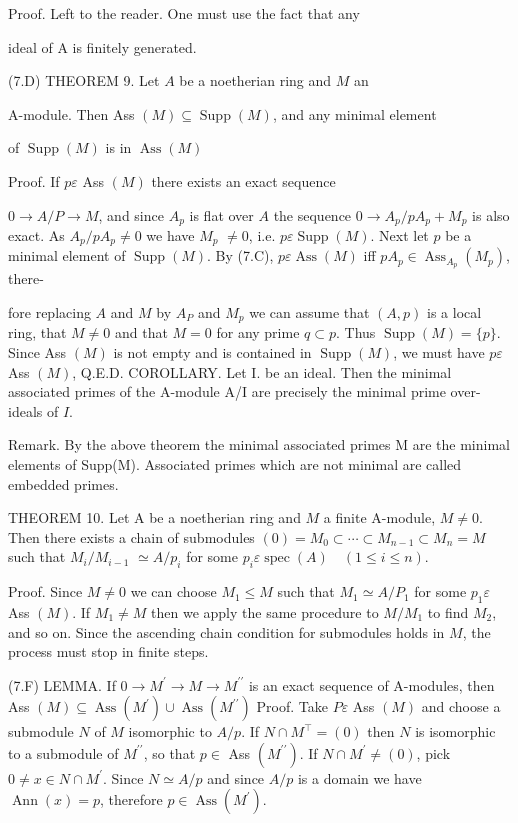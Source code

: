 Proof. Left to the reader. One must use the fact that any

ideal of A is finitely generated.

(7.D) THEOREM 9. Let $A$ be a noetherian ring and $M$ an

A-module. Then Ass $(M) \subseteq \operatorname{Supp}(M)$, and any minimal element

of $\operatorname{Supp}(M)$ is in $\operatorname{Ass}(M)$

Proof. If $p \varepsilon$ Ass $(M)$ there exists an exact sequence

$0 \rightarrow A / P \rightarrow M$, and since $A_{p}$ is flat over $A$ the sequence $0 \rightarrow A_{p} / p A_{p}+M_{p}$ is also exact. As $A_{p} / p A_{p} \neq 0$ we have $M_{p}$ $\neq 0$, i.e. $p \varepsilon \operatorname{Supp}(M)$. Next let $p$ be a minimal element of $\operatorname{Supp}(M)$. By (7.C), $p \varepsilon \operatorname{Ass}(M)$ iff $p A_{p} \in \operatorname{Ass}_{A_{p}}\left(M_{p}\right)$, there-

fore replacing $A$ and $M$ by $A_{P}$ and $M_{p}$ we can assume that $(A, p)$ is a local ring, that $M \neq 0$ and that $M=0$ for any prime $q \subset p .$ Thus $\operatorname{Supp}(M)=\{p\}$. Since Ass $(M)$ is not empty and is contained in $\operatorname{Supp}(M)$, we must have $p \varepsilon$ Ass $(M)$, Q.E.D. COROLLARY. Let I. be an ideal. Then the minimal associated primes of the A-module A/I are precisely the minimal prime over-ideals of $I$.

Remark. By the above theorem the minimal associated primes M are the minimal elements of Supp(M). Associated primes which are not minimal are called embedded primes.

THEOREM 10. Let A be a noetherian ring and $M$ a finite A-module, $M \neq 0$. Then there exists a chain of submodules $(0)=M_{0} \subset \cdots \subset M_{n-1} \subset M_{n}=M$ such that $M_{i} / M_{i-1}$ $\simeq A / p_{i}$ for some $p_{i} \varepsilon \operatorname{spec}(A) \quad(1 \leqslant i \leqslant n)$.

Proof. Since $M \neq 0$ we can choose $M_{1} \leqslant M$ such that $M_{1} \simeq A / P_{1}$ for some $p_{1} \varepsilon$ Ass $(M)$. If $M_{1} \neq M$ then we apply the same procedure to $M / M_{1}$ to find $M_{2}$, and so on. Since the ascending chain condition for submodules holds in $M$, the process must stop in finite steps.

(7.F) LEMMA. If $0 \rightarrow M^{\prime} \rightarrow M \rightarrow M^{\prime \prime}$ is an exact sequence of A-modules, then Ass $(M) \subseteq \operatorname{Ass}\left(M^{\prime}\right) \cup \operatorname{Ass}\left(M^{\prime \prime}\right)$ Proof. Take $P \varepsilon$ Ass $(M)$ and choose a submodule $N$ of $M$ isomorphic to $A / p$. If $N \cap M^{\top}=(0)$ then $N$ is isomorphic to a submodule of $M^{\prime \prime}$, so that $p \in$ Ass $\left(M^{\prime \prime}\right)$. If $N \cap M^{\prime} \neq(0)$, pick $0 \neq x \in N \cap M^{\prime}$. Since $N \simeq A / p$ and since $A / p$ is a domain we have $\operatorname{Ann}(x)=p$, therefore $p \in \operatorname{Ass}\left(M^{\prime}\right) .$

